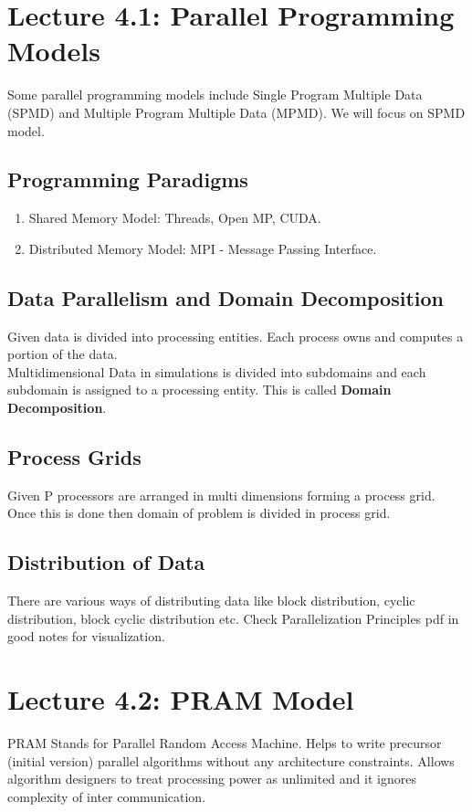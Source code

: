 \documentclass{article}
\begin{document}
\section*{Lecture 4.1: Parallel Programming Models}
Some parallel programming models include Single Program Multiple Data (SPMD) and Multiple Program Multiple Data (MPMD). We will focus on SPMD model. \\

\subsection*{Programming Paradigms}
\begin{enumerate}
    \item Shared Memory Model: Threads, Open MP, CUDA.
    \item Distributed Memory Model: MPI - Message Passing Interface.
\end{enumerate}

\subsection*{Data Parallelism and Domain Decomposition}
Given data is divided into processing entities. Each process owns and computes a portion of the data.\\
Multidimensional Data in simulations is divided into subdomains and each subdomain is assigned to a processing entity. This is called \textbf{Domain Decomposition}. 

\subsection*{Process Grids} 
Given P processors are arranged in multi dimensions forming a process grid. Once this is done then domain of problem is divided in process grid.

\subsection*{Distribution of Data}
There are various ways of distributing data like block distribution, cyclic distribution, block cyclic distribution etc. Check Parallelization Principles pdf in good notes for visualization.

\section*{Lecture 4.2: PRAM Model}
PRAM Stands for Parallel Random Access Machine. Helps to write precursor (initial version) parallel algorithms without any architecture constraints. Allows algorithm designers to treat processing power as unlimited and it ignores complexity of inter communication.
\end{document}

